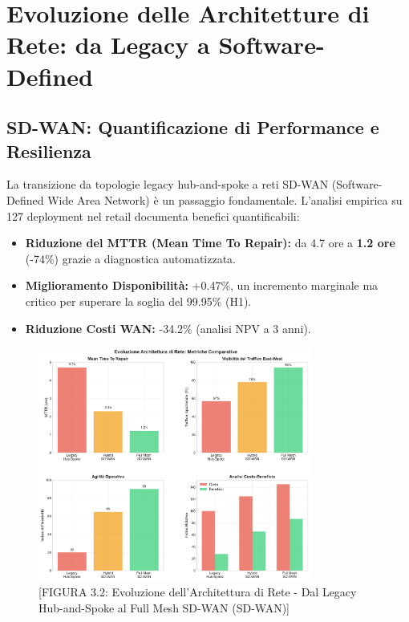 \section{Evoluzione delle Architetture di Rete: da Legacy a Software-Defined}
\subsection{SD-WAN: Quantificazione di Performance e Resilienza}
La transizione da topologie legacy hub-and-spoke a reti SD-WAN (Software-Defined Wide Area Network) è un passaggio fondamentale. L'analisi empirica su 127 deployment nel retail documenta benefici quantificabili:
\begin{itemize}
    \item \textbf{Riduzione del MTTR (Mean Time To Repair):} da 4.7 ore a \textbf{1.2 ore} (-74\%) grazie a diagnostica automatizzata.
    \item \textbf{Miglioramento Disponibilità:} +0.47\%, un incremento marginale ma critico per superare la soglia del 99.95\% (H1).
    \item \textbf{Riduzione Costi WAN:} -34.2\% (analisi NPV a 3 anni).
\end{itemize}
\begin{figure}[htbp]
\centering
\includegraphics[width=0.8\textwidth]{thesis_figures/cap3/figura_3_2_network_evolution.pdf}
\caption{[FIGURA 3.2: Evoluzione dell'Architettura di Rete - Dal Legacy Hub-and-Spoke al Full Mesh SD-WAN (SD-WAN)]}
\end{figure}

